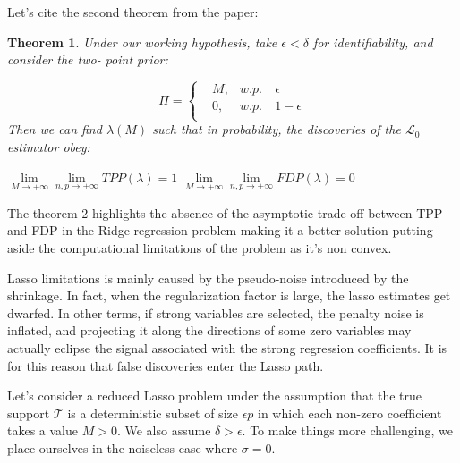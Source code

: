 \documentclass[10pt,onecolumn,letterpaper]{article}
\newtheorem{theorem}{Theorem}
\begin{document}
Let's cite the second theorem from the paper:

\begin{theorem}
   Under our working hypothesis, take $\epsilon < \delta$ for identifiability, and consider the two- point prior:

   \begin{equation}
      \Pi = 
      \left\{
          \begin{aligned}
            &M,      &w.p. ~&\epsilon \\
            &0,      &w.p. ~& 1 - \epsilon \\
          \end{aligned}
        \right.
    \end{equation}
   Then we can find $\lambda(M)$ such that in probability, the discoveries of the $\mathcal{L}_0$ estimator obey:

   \begin{center}
      $\lim\limits_{M \rightarrow +\infty} \lim\limits_{n,p \rightarrow +\infty}  TPP(\lambda) = 1$
      $\lim\limits_{M \rightarrow +\infty} \lim\limits_{n,p \rightarrow +\infty}  FDP(\lambda) = 0$
      \end{center}


\end{theorem}

The theorem 2 highlights the absence of the asymptotic trade-off between TPP and FDP in the Ridge regression problem making it a better solution putting aside the computational limitations of the problem as it's non convex. 
\newline


Lasso limitations is mainly caused by the pseudo-noise introduced by the shrinkage. In fact, when the regularization factor is large, the lasso estimates get dwarfed. In other terms, if strong variables are selected, the penalty noise is inflated, and projecting it along the directions of some zero variables may actually eclipse the signal associated with the strong regression coefficients. It is for this reason that false discoveries enter the Lasso path.
\newline


Let's consider a reduced Lasso problem under the assumption that the true support $\mathcal{T}$ is a deterministic subset of size $\epsilon p$ in which each non-zero coefficient takes a value $M > 0$. We also assume $\delta > \epsilon$. To make things more challenging, we place ourselves in the noiseless case where $\sigma = 0$. 
\end{document}
